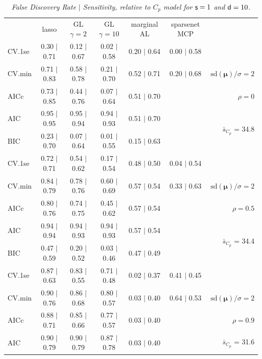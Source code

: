 \documentclass[12pt]{article}
\newcommand{\mr}[1]{\mathrm{#1}}
\newcommand{\bm}[1]{\mathbf{#1}}
\begin{document}
\begin{table}[p]\vspace{-.5cm}
\caption[l]{\it False Discovery Rate $\mid$ Sensitivity, relative to $C_p$ model  for ${\sf s}=1$ and ${\sf d}=10$.}
\vspace{-.5cm}
\small{}
\begin{center}
\begin{tabular}{l*{5}{c}|r}
 & lasso & GL $\gamma=2$ & GL $\gamma=10$ & marginal AL & sparsenet MCP  & \\
 \cline{1-7}
CV.1se & 0.30 $\mid$ 0.71 & 0.12 $\mid$ 0.67 & 0.02 $\mid$ 0.58 & 0.20 $\mid$ 0.64 & 0.00 $\mid$ 0.58 &\\
CV.min & 0.71 $\mid$ 0.83 & 0.58 $\mid$ 0.78 & 0.21 $\mid$ 0.70 & 0.52 $\mid$ 0.71 & 0.20 $\mid$ 0.68 &  $\mr{sd}(\bm{\mu})/\sigma=2$ \\
AICc & 0.73 $\mid$ 0.85 & 0.44 $\mid$ 0.76 & 0.07 $\mid$ 0.64 & 0.51 $\mid$ 0.70 & & $\rho=0$ \\
AIC & 0.95 $\mid$ 0.95 & 0.95 $\mid$ 0.94 & 0.94 $\mid$ 0.93 & 0.51 $\mid$ 0.70 & & \multirow{2}{*}{$\bar{s}_{C_p}$ = 34.8} \\
BIC & 0.23 $\mid$ 0.70 & 0.07 $\mid$ 0.64 & 0.01 $\mid$ 0.55 & 0.15 $\mid$ 0.63 & & \\
 \hline 
CV.1se & 0.72 $\mid$ 0.71 & 0.54 $\mid$ 0.62 & 0.17 $\mid$ 0.54 & 0.48 $\mid$ 0.50 & 0.04 $\mid$ 0.54 &\\
CV.min & 0.84 $\mid$ 0.79 & 0.78 $\mid$ 0.76 & 0.60 $\mid$ 0.69 & 0.57 $\mid$ 0.54 & 0.33 $\mid$ 0.63 &  $\mr{sd}(\bm{\mu})/\sigma=2$ \\
AICc & 0.80 $\mid$ 0.76 & 0.74 $\mid$ 0.75 & 0.45 $\mid$ 0.62 & 0.57 $\mid$ 0.54 & & $\rho=0.5$ \\
AIC & 0.94 $\mid$ 0.94 & 0.94 $\mid$ 0.93 & 0.94 $\mid$ 0.93 & 0.57 $\mid$ 0.54 & & \multirow{2}{*}{$\bar{s}_{C_p}$ = 34.4} \\
BIC & 0.47 $\mid$ 0.59 & 0.20 $\mid$ 0.52 & 0.03 $\mid$ 0.46 & 0.47 $\mid$ 0.49 & & \\
 \hline 
CV.1se & 0.87 $\mid$ 0.63 & 0.83 $\mid$ 0.55 & 0.71 $\mid$ 0.48 & 0.02 $\mid$ 0.37 & 0.41 $\mid$ 0.45 &\\
CV.min & 0.90 $\mid$ 0.76 & 0.86 $\mid$ 0.68 & 0.80 $\mid$ 0.57 & 0.03 $\mid$ 0.40 & 0.64 $\mid$ 0.53 &  $\mr{sd}(\bm{\mu})/\sigma=2$ \\
AICc & 0.88 $\mid$ 0.71 & 0.85 $\mid$ 0.66 & 0.77 $\mid$ 0.57 & 0.03 $\mid$ 0.40 & & $\rho=0.9$ \\
AIC & 0.90 $\mid$ 0.79 & 0.90 $\mid$ 0.79 & 0.87 $\mid$ 0.78 & 0.03 $\mid$ 0.40 & & \multirow{2}{*}{$\bar{s}_{C_p}$ = 31.6} \\

\end{tabular}
\end{center}
\end{table}
\end{document}
